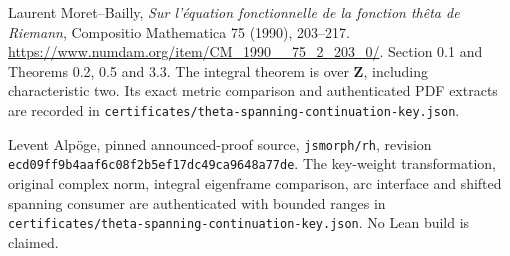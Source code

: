 Laurent Moret--Bailly, \emph{Sur l'\'equation fonctionnelle de la
fonction th\^eta de Riemann}, Compositio Mathematica 75 (1990),
203--217. \url{https://www.numdam.org/item/CM_1990__75_2_203_0/}.
Section 0.1 and Theorems 0.2, 0.5 and 3.3.  The integral theorem
is over $\mathbf Z$, including characteristic two.  Its exact
metric comparison and authenticated PDF extracts are recorded in
\texttt{certificates/theta-spanning-continuation-key.json}.

Levent Alp\"oge, pinned announced-proof source,
\texttt{jsmorph/rh}, revision
\texttt{ecd09ff9b4aaf6c08f2b5ef17dc49ca9648a77de}.
The key-weight transformation, original complex norm, integral
eigenframe comparison, arc interface and shifted spanning consumer
are authenticated with bounded ranges in
\texttt{certificates/theta-spanning-continuation-key.json}.
No Lean build is claimed.

